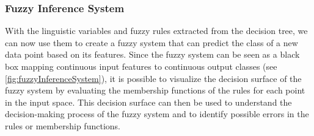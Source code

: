\subsubsection{Fuzzy Inference System}

With the linguistic variables and fuzzy rules extracted from the decision tree, we can now use them to create a fuzzy system that can predict the class of a new data point based on its features. Since the fuzzy system can be seen as a black box mapping continuous input features to continuous output classes
(see \autoref{fig:fuzzyInferenceSystem}), it is possible to visualize the decision surface of the fuzzy system by evaluating the membership functions of the rules for each point in the input space. This decision surface can then be used to understand the decision-making process of the fuzzy system and to identify possible errors in the rules or membership functions.


